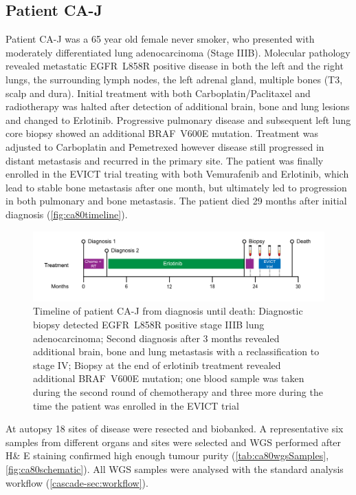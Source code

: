 \subsection{Patient CA-J}
\label{cascade-sec:CA80}

Patient CA-J was a 65 year old female never smoker, who presented with moderately differentiated lung  adenocarcinoma (Stage IIIB). Molecular pathology revealed metastatic EGFR~L858R positive disease in both the left and the right lungs, the surrounding lymph nodes, the left adrenal gland, multiple bones (T3, scalp and dura). Initial treatment with both Carboplatin/Paclitaxel and radiotherapy was halted after detection of additional brain, bone and lung lesions and changed to Erlotinib. Progressive pulmonary disease and subsequent left lung core biopsy showed an additional BRAF~V600E mutation. Treatment was adjusted to Carboplatin and Pemetrexed however disease still progressed in distant metastasis and recurred in the primary site. The patient was finally enrolled in the EVICT trial treating with both Vemurafenib and Erlotinib, which lead to stable bone metastasis after one month, but ultimately led to progression in both pulmonary and bone metastasis. The patient died 29 months after initial diagnosis (\autoref{fig:ca80timeline}).

\begin{figure}[ht]
\centering
\includegraphics[width=.99\linewidth]{Figures/CASCADE/CA80/CA-J_timeline}
\caption[Timeline of patient CA-J from diagnosis until death]{Timeline of patient CA-J from diagnosis until death: Diagnostic biopsy detected EGFR~L858R positive stage IIIB lung adenocarcinoma; Second diagnosis after 3 months revealed additional brain, bone and lung metastasis with a reclassification to stage IV; Biopsy at the end of erlotinib treatment revealed additional BRAF~V600E mutation; one blood sample was taken during the second round of chemotherapy and three more during the time the patient was enrolled in the EVICT trial} \label{fig:ca80timeline}
\end{figure}


At autopsy 18 sites of disease were resected and biobanked. A representative six samples from different organs and sites were selected and WGS performed after H\& E staining confirmed high enough tumour purity (\autoref{tab:ca80wgsSamples}, \autoref{fig:ca80schematic}). All WGS samples were analysed with the standard analysis workflow (\autoref{cascade-sec:workflow}).


